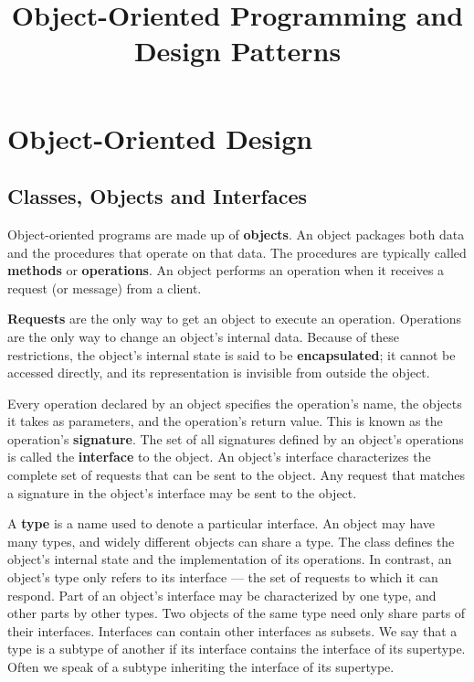 \documentclass{article}
\title{\vspace{-3cm} Object-Oriented Programming and Design Patterns}
\author{}
\date{}
\begin{document}
\maketitle
\vspace{-1.5cm}
\tableofcontents
\newpage
\section{Object-Oriented Design}
\subsection{Classes, Objects and Interfaces}

Object-oriented programs are made up of \textbf{objects}. An object packages both data and the procedures that operate on that data. The procedures are typically called \textbf{methods} or \textbf{operations}. An object performs an operation when it receives a request (or message) from a client.

\textbf{Requests} are the only way to get an object to execute an operation. Operations are the only way to change an object's internal data. Because of these restrictions, the object's internal state is said to be \textbf{encapsulated}; it cannot be accessed directly, and its representation is invisible from outside the object.

Every operation declared by an object specifies the operation's name, the objects it takes as parameters, and the operation's return value. This is known as the operation's \textbf{signature}. The set of all signatures defined by an object's operations is called the \textbf{interface} to the object. An object's interface characterizes the complete set of requests that can be sent to the object. Any request that matches a signature in the object's interface may be sent to the object.

A \textbf{type} is a name used to denote a particular interface. An object may have many types, and widely different objects can share a type. The class defines the object's internal state and the implementation of its operations. In contrast, an object's type only refers to its interface — the set of requests to which it can respond. Part of an object's interface may be characterized by one type, and other parts by other types. Two objects of the same type need only share parts of their interfaces. Interfaces can contain other interfaces as subsets. We say that a type is a subtype of another if its interface contains the interface of its supertype. Often we speak of a subtype inheriting the interface of its supertype.
\end{document}
